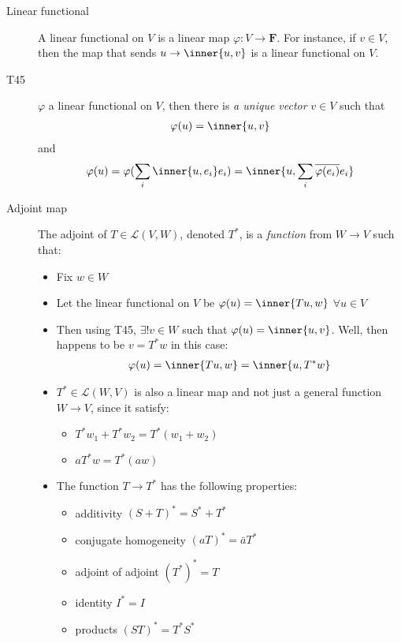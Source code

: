 \begin{description}
\item[Linear functional] A linear functional on $V$ is a linear map $\varphi:V\to\mathbf{F}$. For instance, if $v\in V$, then the map that sends $u\to\inner{u,v}$ is a linear functional on $V$.

\item[T45] $\varphi$ a linear functional on $V$, then there is \emph{a unique vector} $v\in V$ such that 
\begin{align*}
\varphi(u)=\inner{u,v}
\end{align*}and
\begin{align*}
\varphi(u) = \varphi(\sum\limits_i \inner{u,e_i}e_i) = 
\inner{u, \sum\limits_i \overline{\varphi(e_i)}e_i}
\end{align*}

\item[Adjoint map\label{itm:D6_adjoint}] The adjoint of $T\in\mathcal{L}(V,W)$, denoted $T^*$, is a \emph{function} from $W\to V$ such that:
\begin{itemize}
\item Fix $w\in W$
\item Let the linear functional on $V$ be $\varphi(u)=\inner{Tu,w}$ $\forall u\in V$
\item Then using T45, $\exists!v\in W$ such that $\varphi(u)=\inner{u,v}$. Well, then happens to be $v=T^*w$ in this case:
\begin{align*}
\varphi(u) = \inner{Tu,w} =\inner{u,T^*w} 
\end{align*}

\item $T^*\in \mathcal{L}(W,V)$ is also a linear map and not just a general function $W\to V$, since it satisfy:
\begin{itemize}
\item $T^*w_1+T^*w_2 = T^*(w_1+w_2)$
\item $aT^*w = T^*(aw)$
\end{itemize}

\item The function $T\to T^*$ has the following properties:
\begin{itemize}
\item additivity $(S+T)^*=S^*+T^*$
\item conjugate homogeneity $(aT)^*=\bar{a}T^*$
\item adjoint of adjoint $(T^*)^* = T$
\item identity $I^*=I$ 
\item products $(ST)^* = T^*S^*$
\end{itemize}
\end{itemize}


\end{description}
